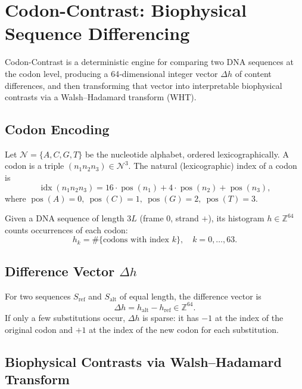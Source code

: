 \documentclass[12pt]{article}
\begin{document}
\section{Codon-Contrast: Biophysical Sequence Differencing}
\label{sec:codon}

Codon-Contrast is a deterministic engine for comparing two DNA sequences at the codon level, producing a 64‑dimensional integer vector $\Delta h$ of content differences, and then transforming that vector into interpretable biophysical contrasts via a Walsh–Hadamard transform (WHT).

\subsection{Codon Encoding}

Let $\mathcal{N} = \{A,C,G,T\}$ be the nucleotide alphabet, ordered lexicographically. A codon is a triple $(n_1 n_2 n_3) \in \mathcal{N}^3$. The natural (lexicographic) index of a codon is
\[
\operatorname{idx}(n_1 n_2 n_3) = 16\cdot \operatorname{pos}(n_1) + 4\cdot \operatorname{pos}(n_2) + \operatorname{pos}(n_3),
\]
where $\operatorname{pos}(A)=0,\ \operatorname{pos}(C)=1,\ \operatorname{pos}(G)=2,\ \operatorname{pos}(T)=3$.

Given a DNA sequence of length $3L$ (frame $0$, strand $+$), its histogram $h \in \mathbb{Z}^{64}$ counts occurrences of each codon:
\[
h_k = \#\{\text{codons with index }k\},\quad k=0,\dots,63.
\]

\subsection{Difference Vector $\Delta h$}

For two sequences $S_{\text{ref}}$ and $S_{\text{alt}}$ of equal length, the difference vector is
\[
\Delta h = h_{\text{alt}} - h_{\text{ref}} \in \mathbb{Z}^{64}.
\]
If only a few substitutions occur, $\Delta h$ is sparse: it has $-1$ at the index of the original codon and $+1$ at the index of the new codon for each substitution.

\subsection{Biophysical Contrasts via Walsh–Hadamard Transform}
\end{document}

